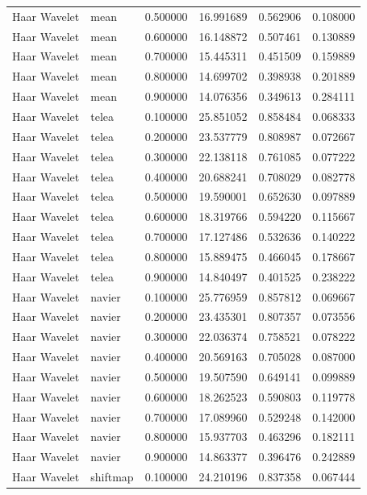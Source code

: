 \begin{table}[h]
\begin{tabular}{llrrrr}
Haar Wavelet & mean & 0.500000 & 16.991689 & 0.562906 & 0.108000 \\
Haar Wavelet & mean & 0.600000 & 16.148872 & 0.507461 & 0.130889 \\
Haar Wavelet & mean & 0.700000 & 15.445311 & 0.451509 & 0.159889 \\
Haar Wavelet & mean & 0.800000 & 14.699702 & 0.398938 & 0.201889 \\
Haar Wavelet & mean & 0.900000 & 14.076356 & 0.349613 & 0.284111 \\
Haar Wavelet & telea & 0.100000 & 25.851052 & 0.858484 & 0.068333 \\
Haar Wavelet & telea & 0.200000 & 23.537779 & 0.808987 & 0.072667 \\
Haar Wavelet & telea & 0.300000 & 22.138118 & 0.761085 & 0.077222 \\
Haar Wavelet & telea & 0.400000 & 20.688241 & 0.708029 & 0.082778 \\
Haar Wavelet & telea & 0.500000 & 19.590001 & 0.652630 & 0.097889 \\
Haar Wavelet & telea & 0.600000 & 18.319766 & 0.594220 & 0.115667 \\
Haar Wavelet & telea & 0.700000 & 17.127486 & 0.532636 & 0.140222 \\
Haar Wavelet & telea & 0.800000 & 15.889475 & 0.466045 & 0.178667 \\
Haar Wavelet & telea & 0.900000 & 14.840497 & 0.401525 & 0.238222 \\
Haar Wavelet & navier & 0.100000 & 25.776959 & 0.857812 & 0.069667 \\
Haar Wavelet & navier & 0.200000 & 23.435301 & 0.807357 & 0.073556 \\
Haar Wavelet & navier & 0.300000 & 22.036374 & 0.758521 & 0.078222 \\
Haar Wavelet & navier & 0.400000 & 20.569163 & 0.705028 & 0.087000 \\
Haar Wavelet & navier & 0.500000 & 19.507590 & 0.649141 & 0.099889 \\
Haar Wavelet & navier & 0.600000 & 18.262523 & 0.590803 & 0.119778 \\
Haar Wavelet & navier & 0.700000 & 17.089960 & 0.529248 & 0.142000 \\
Haar Wavelet & navier & 0.800000 & 15.937703 & 0.463296 & 0.182111 \\
Haar Wavelet & navier & 0.900000 & 14.863377 & 0.396476 & 0.242889 \\
Haar Wavelet & shiftmap & 0.100000 & 24.210196 & 0.837358 & 0.067444 \\

\end{tabular}
\end{table}
